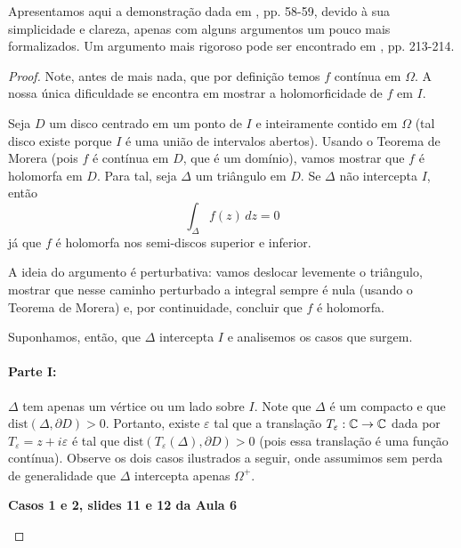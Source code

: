     Apresentamos aqui a demonstração dada em \cite{MR1976398}, pp. 58-59, 
    devido à sua simplicidade e clareza, apenas com alguns argumentos um pouco mais
    formalizados. Um argumento mais rigoroso pode ser encontrado em \cite{MR503901}, pp. 213-214.
    
    \begin{proof}
        Note, antes de mais nada, que por definição temos $f$ contínua em $\Omega$.
        A nossa única dificuldade se encontra em mostrar a holomorficidade de $f$ em $I$.
        
        Seja $D$ um disco centrado em um ponto de $I$ e inteiramente contido em $\Omega$
        (tal disco existe porque $I$ é uma união de intervalos abertos).
        Usando o Teorema de Morera (pois $f$ é contínua em $D$, que é um domínio), 
        vamos mostrar que $f$ é holomorfa em $D$. Para tal,
        seja $\Delta$ um triângulo em $D$. Se $\Delta$ não intercepta $I$, então
        \begin{equation*}
            \int_{\Delta} f(z) \, dz = 0
        \end{equation*}
        já que $f$ é holomorfa nos semi-discos superior e inferior.
        
        A ideia do argumento é perturbativa: vamos deslocar levemente o triângulo,
        mostrar que nesse caminho perturbado a integral sempre é nula 
        (usando o Teorema de Morera) e, por continuidade, concluir que $f$ é holomorfa.
        
        Suponhamos, então, que $\Delta$ intercepta $I$ e analisemos os casos que surgem.
        \paragraph{Parte I:} $\Delta$ tem apenas um vértice ou um lado sobre $I$. 
        Note que $\Delta$ é um compacto e que $\text{dist}(\Delta, \partial D) > 0$.
        Portanto, existe $\varepsilon$ tal que a translação $T_{\varepsilon}:\mathbb{C}\to\mathbb{C}$
        dada por $T_{\varepsilon} = z + i\varepsilon$ é tal que 
        $\text{dist}(T_{\varepsilon}(\Delta), \partial D) > 0$ (pois essa translação
        é uma função contínua). Observe os dois casos ilustrados a seguir, onde assumimos
        sem perda de generalidade que $\Delta$ intercepta apenas $\Omega^+$.
        
        \begin{center}
            {\bf Casos 1 e 2, slides 11 e 12 da Aula 6}
        \end{center}
        

\end{proof}
